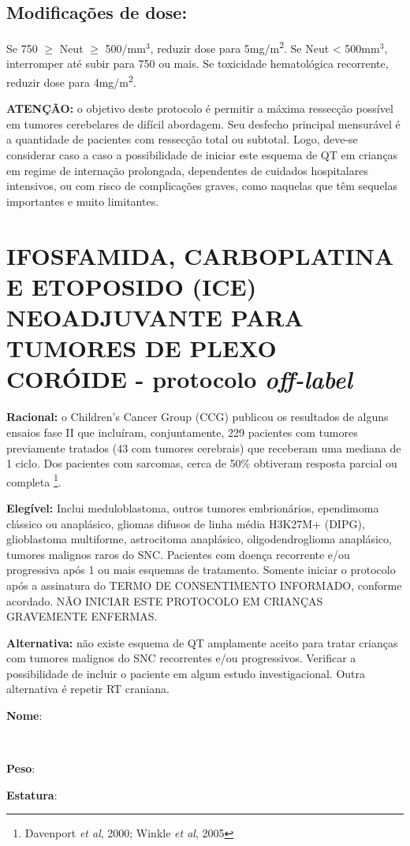 \documentclass[11pt,a4paper,oldfontcommands]{memoir}
\def\entrywithlabel[#1]#2{\parbox{#1}{{\small #2:} \hrulefill}}
\begin{document}
\subsection{Modificações de dose:}
Se 750 $\geq$ Neut $\geq$ 500/mm\(^3\), reduzir dose para 5mg/m\textsuperscript{2}. Se Neut < 500mm\(^3\), interromper até subir para 750 ou mais. Se toxicidade hematológica recorrente, reduzir dose para 4mg/m\textsuperscript{2}.

\textbf{ATENÇÃO:} o objetivo deste protocolo é permitir a máxima ressecção possível em tumores cerebelares de difícil abordagem. Seu desfecho principal mensurável é a quantidade de pacientes com ressecção total ou subtotal. Logo, deve-se considerar caso a caso a possibilidade de iniciar este esquema de QT em crianças em regime de internação prolongada, dependentes de cuidados hospitalares intensivos, ou com risco de complicações graves, como naquelas que têm sequelas importantes e muito limitantes.
\clearpage

\section{IFOSFAMIDA, CARBOPLATINA E ETOPOSIDO (ICE) NEOADJUVANTE PARA TUMORES DE PLEXO CORÓIDE - protocolo \textit{off-label}}
{\let\thefootnote\relax{}}
\textbf{Racional:} o Children's Cancer Group (CCG) publicou os resultados de alguns ensaios fase II que incluíram, conjuntamente, 229 pacientes com tumores previamente tratados (43 com tumores cerebrais) que receberam uma mediana de 1 ciclo. Dos pacientes com sarcomas, cerca de 50\% obtiveram resposta parcial ou completa \footnote{Davenport \textit{et al}, 2000; Winkle \textit{et al}, 2005}.

\textbf{Elegível:} Inclui meduloblastoma, outros tumores embrionários, ependimoma clássico ou anaplásico, gliomas difusos de linha média H3K27M+ (DIPG), glioblastoma multiforme, astrocitoma anaplásico, oligodendroglioma anaplásico, tumores malignos raros do SNC. Pacientes com doença recorrente e/ou progressiva após 1 ou mais esquemas de tratamento. Somente iniciar o protocolo após a assinatura do TERMO DE CONSENTIMENTO INFORMADO, conforme acordado. NÃO INICIAR ESTE PROTOCOLO EM CRIANÇAS GRAVEMENTE ENFERMAS.

\textbf{Alternativa:} não existe esquema de QT amplamente aceito para tratar crianças com tumores malignos do SNC recorrentes e/ou progressivos. Verificar a possibilidade de incluir o paciente em algum estudo investigacional. Outra alternativa é repetir RT craniana.
\\[0.4cm]
\entrywithlabel[1\hsize]{\textbf{Nome}}\hfill
\\[0.3cm]
\entrywithlabel[.45\hsize]{\textbf{Peso}}\hfill  \entrywithlabel[.45\hsize]{\textbf{Estatura}}
\end{document}

